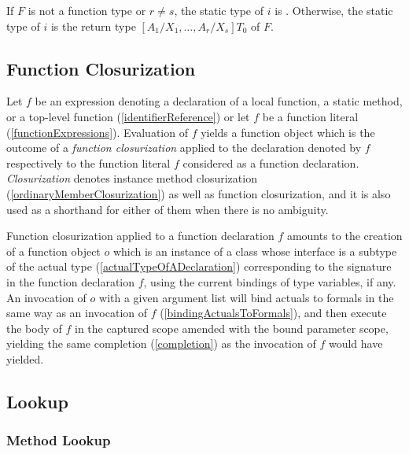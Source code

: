 \documentclass{article}
\begin{document}
\LMHash{}
If $F$ is not a function type or $r \not= s$, the static type of $i$ is \DYNAMIC{}.
Otherwise, the static type of $i$ is the return type
$[A_1/X_1, \ldots, A_r/X_s]T_0$ of $F$.


\subsection{Function Closurization}

\LMHash{}
Let $f$ be an expression denoting
a declaration of a local function, a static method, or a top-level function
(\ref{identifierReference})
or let $f$ be a function literal
(\ref{functionExpressions}).
Evaluation of $f$ yields a function object
which is the outcome of a {\em function closurization}
applied to the declaration denoted by $f$
respectively to the function literal $f$ considered as a function declaration.
{\em Closurization} denotes instance method closurization
(\ref{ordinaryMemberClosurization})
as well as function closurization,
and it is also used as a shorthand for either of them when there is no ambiguity.

\LMHash{}
Function closurization applied to a function declaration $f$
amounts to the creation of a function object $o$
which is an instance of a class whose interface is a subtype of the actual type
(\ref{actualTypeOfADeclaration})
corresponding to the signature in the function declaration $f$,
using the current bindings of type variables, if any.
%
An invocation of $o$ with a given argument list will bind actuals to formals
in the same way as an invocation of $f$
(\ref{bindingActualsToFormals}),
and then execute the body of $f$
in the captured scope amended with the bound parameter scope,
yielding the same completion
(\ref{completion})
as the invocation of $f$ would have yielded.


\subsection{Lookup}


\subsubsection{Method Lookup}
\end{document}
